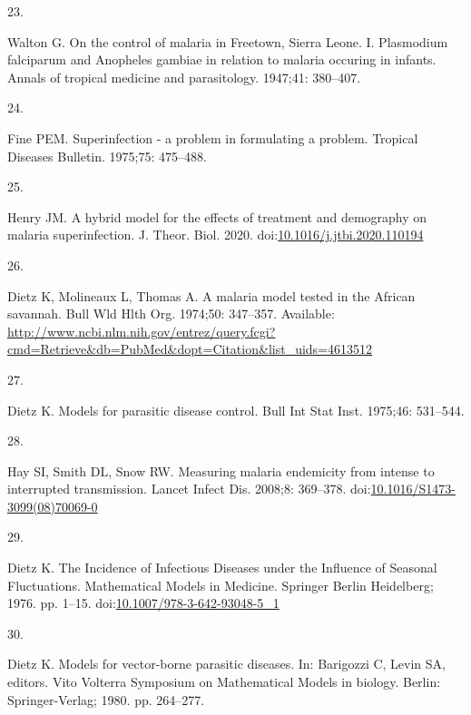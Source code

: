 \documentclass[
]{book}
\newlength{\cslhangindent}
\newlength{\csllabelwidth}
\newlength{\cslentryspacingunit} %
\newenvironment{CSLReferences}[2] %
 {%
  \setlength{\parindent}{0pt}
  \ifodd #1
  \let\oldpar\par
  \def\par{\hangindent=\cslhangindent\oldpar}
  \fi
  \setlength{\parskip}{#2\cslentryspacingunit}
 }%
 {}
\newcommand{\CSLLeftMargin}[1]{\parbox[t]{\csllabelwidth}{#1}}
\newcommand{\CSLRightInline}[1]{\parbox[t]{\linewidth - \csllabelwidth}{#1}\break}
\begin{document}
\begin{CSLReferences}{0}{0}
\leavevmode{}%
\CSLLeftMargin{23. }%
\CSLRightInline{Walton G. On the control of malaria in {Freetown}, {Sierra Leone}. {I}. {Plasmodium} falciparum and {Anopheles} gambiae in relation to malaria occuring in infants. Annals of tropical medicine and parasitology. 1947;41: 380--407. }

\leavevmode{}%
\CSLLeftMargin{24. }%
\CSLRightInline{Fine PEM. Superinfection - a problem in formulating a problem. Tropical Diseases Bulletin. 1975;75: 475--488. }

\leavevmode{}%
\CSLLeftMargin{25. }%
\CSLRightInline{Henry JM. A hybrid model for the effects of treatment and demography on malaria superinfection. J. Theor. Biol. 2020. doi:\href{https://doi.org/10.1016/j.jtbi.2020.110194}{10.1016/j.jtbi.2020.110194}}

\leavevmode{}%
\CSLLeftMargin{26. }%
\CSLRightInline{Dietz K, Molineaux L, Thomas A. A malaria model tested in the {African} savannah. Bull Wld Hlth Org. 1974;50: 347--357. Available: \url{http://www.ncbi.nlm.nih.gov/entrez/query.fcgi?cmd=Retrieve\&db=PubMed\&dopt=Citation\&list_uids=4613512}}

\leavevmode{}%
\CSLLeftMargin{27. }%
\CSLRightInline{Dietz K. Models for parasitic disease control. Bull Int Stat Inst. 1975;46: 531--544. }

\leavevmode{}%
\CSLLeftMargin{28. }%
\CSLRightInline{Hay SI, Smith DL, Snow RW. Measuring malaria endemicity from intense to interrupted transmission. Lancet Infect Dis. 2008;8: 369--378. doi:\href{https://doi.org/10.1016/S1473-3099(08)70069-0}{10.1016/S1473-3099(08)70069-0}}

\leavevmode{}%
\CSLLeftMargin{29. }%
\CSLRightInline{Dietz K. The {Incidence} of {Infectious Diseases} under the {Influence} of {Seasonal Fluctuations}. Mathematical {Models} in {Medicine}. {Springer Berlin Heidelberg}; 1976. pp. 1--15. doi:\href{https://doi.org/10.1007/978-3-642-93048-5_1}{10.1007/978-3-642-93048-5\_1}}

\leavevmode{}%
\CSLLeftMargin{30. }%
\CSLRightInline{Dietz K. Models for vector-borne parasitic diseases. In: Barigozzi C, Levin SA, editors. Vito {Volterra Symposium} on {Mathematical Models} in biology. {Berlin}: {Springer-Verlag}; 1980. pp. 264--277. }


\end{CSLReferences}
\end{document}
